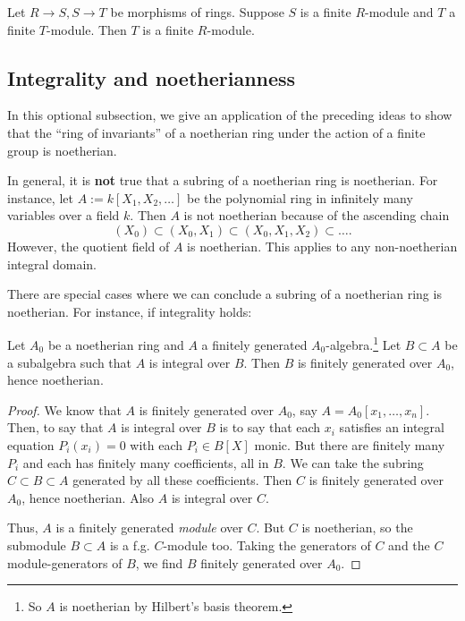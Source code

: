 \begin{exercise}
Let $R \to S, S \to T$ be morphisms of rings. Suppose $S$ is a finite
$R$-module and $T$ a finite $T$-module. Then $T$ is a finite $R$-module.
\end{exercise}

\subsection{Integrality and noetherianness}

In this optional subsection, we give an application of the preceding ideas to
show that the ``ring of invariants'' of a noetherian ring under the action of a
finite group is noetherian.

In general, it is \textbf{not} true  that a subring of a noetherian ring
is noetherian.  For instance, let $A := k[X_1, X_2, \dots]$ be the polynomial
ring in infinitely many variables over a field $k$.  Then $A$ is not noetherian
because of the ascending chain
\[ (X_0) \subset (X_0, X_1) \subset (X_0, X_1, X_2) \subset \dots.\]
However, the quotient field of $A$ is noetherian.  This applies to any
non-noetherian integral domain.

There are special cases where we can conclude a subring of a noetherian ring
is noetherian.
For instance, if integrality holds:

\begin{theorem} Let $A_0$ be  a noetherian ring and $A$ a finitely generated
$A_0$-algebra.\footnote{So $A$ is noetherian by Hilbert's basis theorem.}  Let $B \subset A$ be a subalgebra such that $A$ is integral
over $B$.  Then $B$ is finitely generated over $A_0$, hence noetherian.
\end{theorem}

\begin{proof}
We know that $A$ is finitely generated over $A_0$, say $A=A_0[x_1, \dots, x_n]$.  Then,
 to say that $A$ is integral over $B$ is to say that each
$x_i$ satisfies an integral equation $P_i(x_i)=0$ with each $P_i \in B[X]$ monic.
But there are finitely many $P_i$ and each has finitely many coefficients,
all in $B$.  We can take the subring $C \subset B \subset A$ generated
by all these coefficients.  Then $C$ is finitely generated over $A_0$,
hence noetherian.  Also $A$ is integral over $C$.
  
 Thus, $A$ is a finitely generated \emph{module} over $C$.
 But $C$
is noetherian, so the submodule $B \subset A$ is a f.g. $C$-module too.
Taking the generators of $C$ and the $C$ module-generators of $B$, we find
$B$ finitely generated over $A_0$.
\end{proof}


